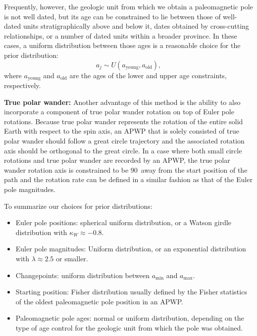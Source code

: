 \documentclass[]{agujournal2019}
\providecommand{\DIFadd}[1]{{\protect\color{blue}\uwave{#1}}} %
\providecommand{\DIFdel}[1]{{\protect\color{red}\sout{#1}}}                      %
\providecommand{\DIFaddbegin}{} %
\providecommand{\DIFaddend}{} %
\providecommand{\DIFdelbegin}{} %
\providecommand{\DIFdelend}{} %
\begin{document}
Frequently, however, the geologic unit from which we obtain a paleomagnetic pole is not well dated, but its age can be constrained to lie between those of well-dated units stratigraphically above and below it, dates obtained by cross-cutting relationships, or a number of dated units within a broader province. In these cases, a uniform distribution between those ages is a reasonable choice for the prior distribution:
\begin{equation}
a_j \sim U(a_\mathrm{young}, a_\mathrm{old}),
\end{equation}
where $a_\mathrm{young}$ and $a_\mathrm{old}$ are the ages of the lower and upper age constraints, respectively.

\textbf{True polar wander:}
Another advantage of this method is the ability to also incorporate a component of true polar wander rotation on top of Euler pole rotations. Because true polar wander represents the rotation of the entire solid Earth with respect to the spin axis, an APWP that is solely consisted of true polar wander should follow a great circle trajectory and the associated rotation axis should be orthogonal to the great circle. In a case where both small circle rotations and true polar wander are recorded by an APWP, the true polar wander rotation axis is constrained to be 90\textdegree\ away from the start position of the path and the rotation rate can be defined in a similar fashion as that of the Euler pole magnitudes.


To summarize our choices for prior distributions:
\begin{itemize}
\item Euler pole positions: spherical uniform distribution, or a Watson girdle distribution with \DIFdelbegin \DIFdel{$\kappa_W \approx -0.8$}\DIFdelend \DIFaddbegin \DIFadd{$\kappa_W \approx -0.7$}\DIFaddend .
\item Euler pole magnitudes: Uniform distribution, or an exponential distribution with $\lambda \approx 2.5$ or smaller.
\item Changepoints: uniform distribution between $a_\mathrm{min}$ and $a_\mathrm{max}$.
\item Starting position: Fisher distribution usually defined by the Fisher statistics of the oldest paleomagnetic pole position in an APWP.
\item Paleomagnetic pole ages: normal or uniform distribution, depending on the type of age control for the geologic unit from which the pole was obtained.
\end{itemize}
\end{document}
